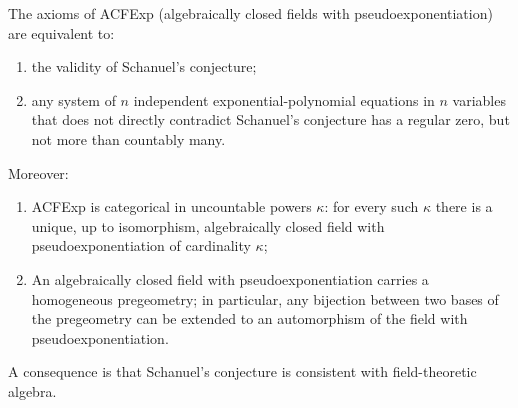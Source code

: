 The axioms of ACFExp (algebraically closed fields with pseudoexponentiation) are equivalent to:
\begin{enumerate}
\item[(a)] the validity of Schanuel's conjecture;
\item[(b)] any system of $n$ independent exponential-polynomial equations in $n$ variables that does not directly contradict Schanuel's conjecture has a regular zero, but not more than countably many.
\end{enumerate}
Moreover:
\begin{enumerate}
\item[(ii)] ACFExp is categorical in uncountable powers $\kappa$: for every such $\kappa$ there is a unique, up to isomorphism, algebraically closed field with pseudoexponentiation of cardinality $\kappa$;
\item[(iii)] An algebraically closed field with pseudoexponentiation carries a homogeneous pregeometry; in particular, any bijection between two bases of the pregeometry can be extended to an automorphism of the field with pseudoexponentiation.
\end{enumerate}
A consequence is that Schanuel's conjecture is consistent with field-theoretic algebra.

